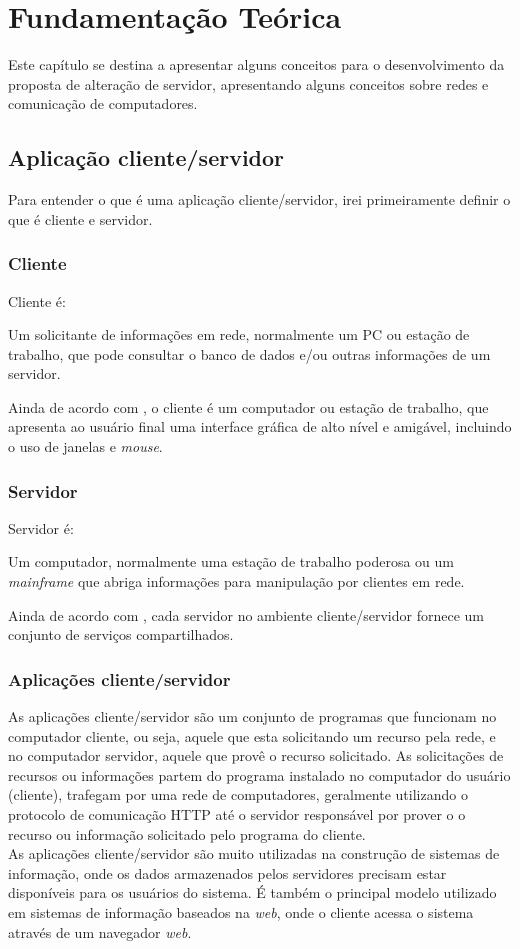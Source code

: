 \chapter{Fundamentação Teórica}\label{fundamentacao-teorica}
Este capítulo se destina a apresentar alguns conceitos para o desenvolvimento da proposta de alteração de servidor, apresentando alguns conceitos sobre redes e comunicação de computadores.
\section{Aplicação cliente/servidor}
Para entender o que é uma aplicação cliente/servidor, irei primeiramente definir o que é cliente e servidor.
\subsection{Cliente}
Cliente é:
\begin{citacao}
Um solicitante de informações em rede, normalmente um PC ou estação de trabalho, que pode consultar o banco de dados e/ou outras informações de um servidor. \cite{stallings2005}
\end{citacao}
Ainda de acordo com , o cliente é um computador ou estação de trabalho, que apresenta ao usuário final uma interface gráfica de alto nível e amigável, incluindo o uso de janelas e \textit{mouse}. 
\subsection{Servidor}
Servidor é:
\begin{citacao}
Um computador, normalmente uma estação de trabalho poderosa ou um \textit{mainframe} que abriga informações para manipulação por clientes em rede. \cite{stallings2005}
\end{citacao}
Ainda de acordo com , cada servidor no ambiente cliente/servidor fornece um conjunto de serviços compartilhados.
\subsection{Aplicações cliente/servidor}
As aplicações cliente/servidor são um conjunto de programas que funcionam no computador cliente, ou seja, aquele que esta solicitando um recurso pela rede, e no computador servidor, aquele que provê o recurso solicitado. As solicitações de recursos ou informações partem do programa instalado no computador do usuário (cliente), trafegam por uma rede de computadores, geralmente utilizando o protocolo de comunicação HTTP até o servidor responsável por prover o o recurso ou informação solicitado pelo programa do cliente.\\
As aplicações cliente/servidor são muito utilizadas na construção de sistemas de informação, onde os dados armazenados pelos servidores precisam estar disponíveis para os usuários do sistema. É também o principal modelo utilizado em sistemas de informação baseados na \textit{web}, onde o cliente acessa o sistema através de um navegador \textit{web}.
